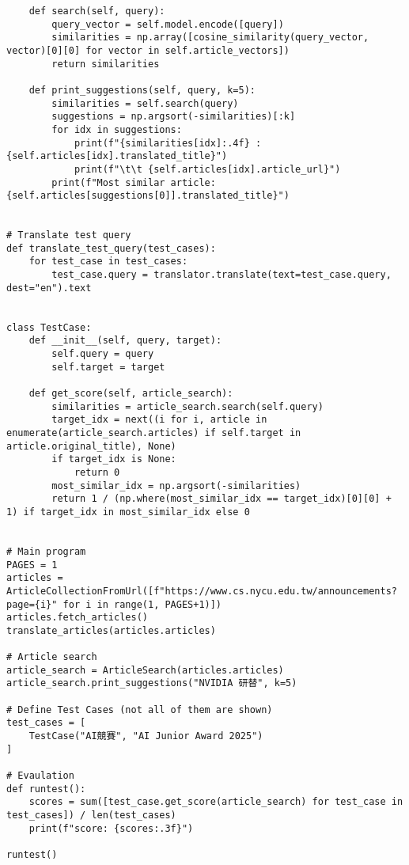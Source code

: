 \begin{lstlisting}
    def search(self, query):
        query_vector = self.model.encode([query])
        similarities = np.array([cosine_similarity(query_vector, vector)[0][0] for vector in self.article_vectors])
        return similarities

    def print_suggestions(self, query, k=5):
        similarities = self.search(query)
        suggestions = np.argsort(-similarities)[:k]
        for idx in suggestions:
            print(f"{similarities[idx]:.4f} : {self.articles[idx].translated_title}")
            print(f"\t\t {self.articles[idx].article_url}")
        print(f"Most similar article: {self.articles[suggestions[0]].translated_title}")


# Translate test query
def translate_test_query(test_cases):
    for test_case in test_cases:
        test_case.query = translator.translate(text=test_case.query, dest="en").text


class TestCase:
    def __init__(self, query, target):
        self.query = query
        self.target = target
    
    def get_score(self, article_search):
        similarities = article_search.search(self.query)
        target_idx = next((i for i, article in enumerate(article_search.articles) if self.target in article.original_title), None)
        if target_idx is None:
            return 0
        most_similar_idx = np.argsort(-similarities)
        return 1 / (np.where(most_similar_idx == target_idx)[0][0] + 1) if target_idx in most_similar_idx else 0


# Main program
PAGES = 1
articles = ArticleCollectionFromUrl([f"https://www.cs.nycu.edu.tw/announcements?page={i}" for i in range(1, PAGES+1)])
articles.fetch_articles()
translate_articles(articles.articles)

# Article search
article_search = ArticleSearch(articles.articles)
article_search.print_suggestions("NVIDIA 研替", k=5)

# Define Test Cases (not all of them are shown)
test_cases = [
    TestCase("AI競賽", "AI Junior Award 2025")
]

# Evaulation
def runtest():
    scores = sum([test_case.get_score(article_search) for test_case in test_cases]) / len(test_cases)
    print(f"score: {scores:.3f}")

runtest()
\end{lstlisting}